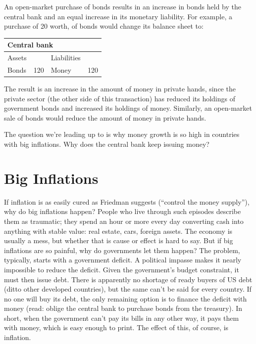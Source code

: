 An open-market purchase of bonds  results in an increase
in bonds  held by the central bank and an equal increase in its
monetary liability.
For example, a purchase of 20 worth, of bonds  would change its
balance sheet to:
%
\begin{center}
\begin{tabular}{lr|lr}
\multicolumn{4}{l}{Central bank} \\
\hline
Assets\phantom{ities}  &&  Liabilities \\
\hline
Bonds &  120 & Money & 120
\end{tabular}
\end{center}
%
The result is an increase in the amount of money in private hands,
since the private sector (the other side of this transaction)
has reduced its holdings of government bonds 
and increased its holdings of money.
Similarly, an open-market sale of bonds  would reduce the amount of money in
private hands.

The question we're leading up to is why money growth is so high
in countries with big inflations.
Why does the central bank keep issuing money?


\section{Big Inflations}

If inflation is as easily cured as Friedman suggests
(``control the money supply''),
why do big inflations happen?
People who live through such
episodes describe them as traumatic; they spend an hour or more
every day converting cash into anything with stable value:  real estate,
cars, foreign assets.
The economy is usually a mess, but whether that is cause or effect is
hard to say.
But if big inflations are so painful, why do governments let them happen?
The problem, typically, starts with a government deficit.
A political impasse makes it nearly impossible to reduce the deficit.
Given the government's budget constraint, it must then issue debt.
There is apparently no shortage of ready buyers of US debt
(ditto other developed countries),
but the same can't be said for every country.
If no one will buy its debt,
the only remaining option is to finance the deficit with money
(read: oblige the central bank to purchase bonds from the treasury).
In short, when the government can't
pay its bills in any other way, it pays them with money, which is
easy enough to print.
The effect of this, of course, is inflation.

